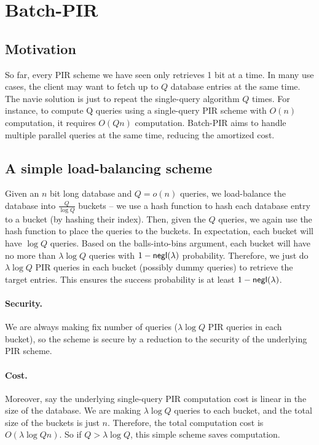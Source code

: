  \section{Batch-PIR}

 \subsection{Motivation}
    So far, every PIR scheme we have seen only retrieves 1 bit at a time. 
    In many use cases, the client may want to fetch up to $Q$ database entries at the same time. 
    The navie solution is just to repeat the single-query algorithm $Q$ times.
    For instance, to compute Q queries using a single-query PIR scheme with $O(n)$ computation, it requires $O(Qn)$ computation.
    Batch-PIR aims to handle multiple parallel queries at the same time, reducing the
     amortized cost.
     
     
\subsection{A simple load-balancing scheme}

Given an $n$ bit long database and $Q=o(n)$ queries, we load-balance the database into $\frac{Q}{\log Q}$ buckets -- we use a hash function to hash each database entry to a bucket (by hashing their index).
Then, given the $Q$ queries, we again use the hash function to place the queries to the buckets. 
In expectation, each bucket will have $\log Q$ queries. 
Based on the balls-into-bins argument, each bucket will have no more than $\lambda \log Q$ queries with $1-{\sf negl}(\lambda)$ probability.
Therefore, we just do $\lambda \log Q$ PIR queries in each bucket (possibly dummy queries) to retrieve the target entries. 
This ensures the success probability is at least $1-{\sf negl}(\lambda)$.

\paragraph{Security.}
We are always making fix number of queries ($\lambda \log Q$ PIR queries in each bucket), so the scheme is secure by a reduction to the security of the underlying PIR scheme.

\paragraph{Cost.}
Moreover, say the underlying single-query PIR computation cost is linear in the size of the database.
We are making $\lambda \log Q$ queries to each bucket, and the total size of the buckets is just $n$. 
Therefore, the total computation cost is $O(\lambda \log Q n)$. 
So if $Q>\lambda \log Q$, this simple scheme saves computation.


